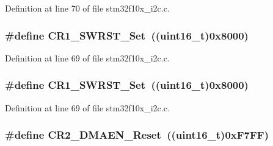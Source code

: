 Definition at line 70 of file stm32f10x\+\_\+i2c.\+c.

\subsubsection[{\texorpdfstring{C\+R1\+\_\+\+S\+W\+R\+S\+T\+\_\+\+Set}{CR1_SWRST_Set}}]{\setlength{\rightskip}{0pt plus 5cm}\#define C\+R1\+\_\+\+S\+W\+R\+S\+T\+\_\+\+Set~(({\bf uint16\+\_\+t})0x8000)}\hypertarget{group___i2_c___private___defines_ga0e067bb108052ea0e8e49feb194c2ca0}{}\label{group___i2_c___private___defines_ga0e067bb108052ea0e8e49feb194c2ca0}


Definition at line 69 of file stm32f10x\+\_\+i2c.\+c.

\subsubsection[{\texorpdfstring{C\+R1\+\_\+\+S\+W\+R\+S\+T\+\_\+\+Set}{CR1_SWRST_Set}}]{\setlength{\rightskip}{0pt plus 5cm}\#define C\+R1\+\_\+\+S\+W\+R\+S\+T\+\_\+\+Set~(({\bf uint16\+\_\+t})0x8000)}\hypertarget{group___i2_c___private___defines_ga0e067bb108052ea0e8e49feb194c2ca0}{}\label{group___i2_c___private___defines_ga0e067bb108052ea0e8e49feb194c2ca0}


Definition at line 69 of file stm32f10x\+\_\+i2c.\+c.

\subsubsection[{\texorpdfstring{C\+R2\+\_\+\+D\+M\+A\+E\+N\+\_\+\+Reset}{CR2_DMAEN_Reset}}]{\setlength{\rightskip}{0pt plus 5cm}\#define C\+R2\+\_\+\+D\+M\+A\+E\+N\+\_\+\+Reset~(({\bf uint16\+\_\+t})0x\+F7\+F\+F)}\hypertarget{group___i2_c___private___defines_gabe742f89a768e29b9a2d86f7782991a6}{}\label{group___i2_c___private___defines_gabe742f89a768e29b9a2d86f7782991a6}


